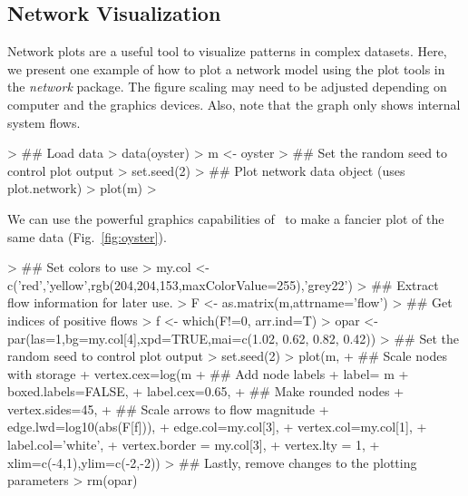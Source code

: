 \documentclass[article]{jss}
\newcommand{\R}{\proglang{R}}
\begin{document}

\subsection{Network Visualization}

Network plots are a useful tool to visualize patterns in complex
datasets. Here, we present one example of how to plot a network model
using the plot tools in the \textit{network} package. The figure
scaling may need to be adjusted depending on computer and the graphics
devices. Also, note that the graph only shows internal system flows.

\begin{Schunk}
\begin{Sinput}
> ## Load data
> data(oyster)
> m <- oyster
> ## Set the random seed to control plot output
> set.seed(2)
> ## Plot network data object (uses plot.network)
> plot(m)
> 
\end{Sinput}
\end{Schunk}

We can use the powerful graphics capabilities of \R\ to make a fancier
plot of the same data (Fig.~\ref{fig:oyster}).


\begin{Schunk}
\begin{Sinput}
> ## Set colors to use
> my.col <- c('red','yellow',rgb(204,204,153,maxColorValue=255),'grey22')
> ## Extract flow information for later use.
> F <- as.matrix(m,attrname='flow')
> ## Get indices of positive flows
> f <- which(F!=0, arr.ind=T)
> opar <- par(las=1,bg=my.col[4],xpd=TRUE,mai=c(1.02, 0.62, 0.82, 0.42))
> ## Set the random seed to control plot output
> set.seed(2)
> plot(m,
+  ## Scale nodes with storage
+       vertex.cex=log(m%
+  ## Add node labels
+       label= m%
+       boxed.labels=FALSE,
+       label.cex=0.65,
+  ## Make rounded nodes
+       vertex.sides=45,
+  ## Scale arrows to flow magnitude
+       edge.lwd=log10(abs(F[f])),
+       edge.col=my.col[3],
+       vertex.col=my.col[1],
+       label.col='white',
+       vertex.border = my.col[3],
+       vertex.lty = 1,
+       xlim=c(-4,1),ylim=c(-2,-2))
> ## Lastly, remove changes to the plotting parameters
> rm(opar)
\end{Sinput}
\end{Schunk}
\end{document}
